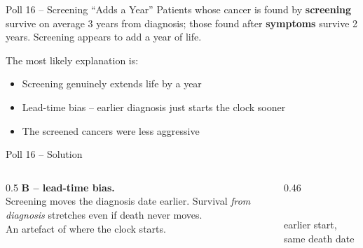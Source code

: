 \documentclass[aspectratio=169]{beamer}
\begin{document}
\begin{frame}{Poll 16 \;--\; Screening ``Adds a Year''}
  \small
  Patients whose cancer is found by \textbf{screening} survive on average 3
  years from diagnosis; those found after \textbf{symptoms} survive 2 years.
  Screening appears to add a year of life.
  \vspace{0.8em}

  The most likely explanation is:
  \begin{itemize}
    \item[\textbf{A.}] Screening genuinely extends life by a year
    \item[\textbf{B.}] Lead-time bias -- earlier diagnosis just starts the clock sooner
    \item[\textbf{C.}] The screened cancers were less aggressive
  \end{itemize}
\end{frame}

\begin{frame}{Poll 16 \;--\; Solution}
  \small
  \begin{columns}[T]
    \begin{column}{0.5\textwidth}
      \textcolor{good}{\textbf{B -- lead-time bias.}}\\[0.4em]
      Screening moves the diagnosis date earlier. Survival \emph{from
      diagnosis} stretches even if death never moves.\\[0.3em]
      An artefact of where the clock starts.
    \end{column}
    \begin{column}{0.46\textwidth}
      \centering
      \\[0.5em]
      {\scriptsize earlier start, same death date}
    \end{column}
  \end{columns}
\end{frame}
\end{document}
